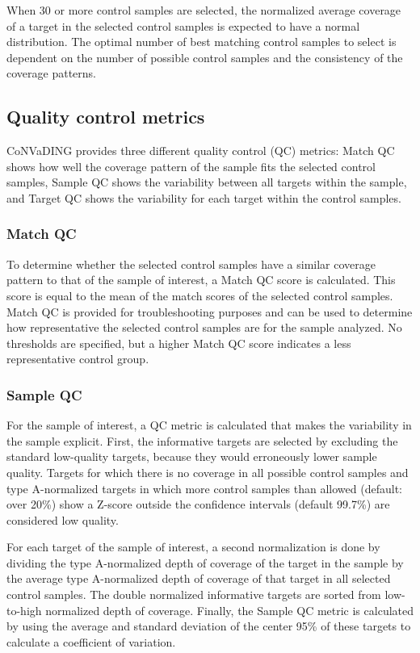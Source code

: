 When 30 or more control samples are selected, the normalized average coverage of a target in the selected control samples is expected to have a normal distribution. The optimal number of best matching control samples to select is dependent on the number of possible control samples and the consistency of the coverage patterns.

\subsection{Quality control metrics}
CoNVaDING provides three different quality control (QC) metrics: Match QC shows how well the coverage pattern of the sample fits the selected control samples, Sample QC shows the variability between all targets within the sample, and Target QC shows the variability for each target within the control samples.

\subsubsection{Match QC}
To determine whether the selected control samples have a similar coverage pattern to that of the sample of interest, a Match QC score is calculated. This score is equal to the mean of the match scores of the selected control samples. 
Match QC is provided for troubleshooting purposes and can be used to determine how representative the selected control samples are for the sample analyzed. 
No thresholds are specified, but a higher Match QC score indicates a less representative control group.

\subsubsection{Sample QC}
For the sample of interest, a QC metric is calculated that makes the variability in the sample explicit. 
First, the informative targets are selected by excluding the standard low-quality targets, because they would erroneously lower sample quality. 
Targets for which there is no coverage in all possible control samples and type A-normalized targets in which more control samples than allowed (default: over 20\%) show a Z-score outside the confidence intervals (default 99.7\%) are considered low quality. 

For each target of the sample of interest, a second normalization is done by dividing the type A-normalized depth of coverage of the target in the sample by the average type A-normalized depth of coverage of that target in all selected control samples. 
The double normalized informative targets are sorted from low-to-high normalized depth of coverage. 
Finally, the Sample QC metric is calculated by using the average and standard deviation of the center 95\% of these targets to calculate a coefficient of variation.

